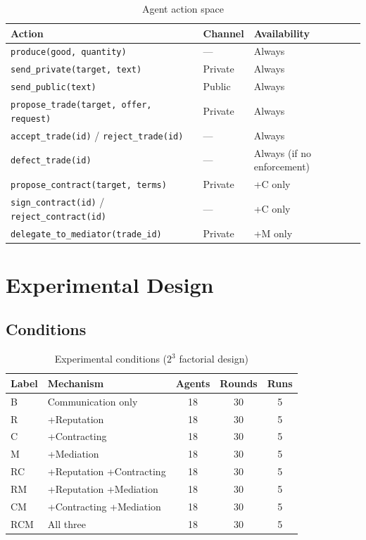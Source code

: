 \documentclass[12pt, a4paper]{article}
\begin{document}
\begin{table}[H]
\centering
\caption{Agent action space}
\label{tab:actions}
\begin{tabular}{@{}lll@{}}
\toprule
Action & Channel & Availability \\
\midrule
\texttt{produce(good, quantity)} & — & Always \\
\texttt{send\_private(target, text)} & Private & Always \\
\texttt{send\_public(text)} & Public & Always \\
\texttt{propose\_trade(target, offer, request)} & Private & Always \\
\texttt{accept\_trade(id)} / \texttt{reject\_trade(id)} & — & Always \\
\texttt{defect\_trade(id)} & — & Always (if no enforcement) \\
\texttt{propose\_contract(target, terms)} & Private & +C only \\
\texttt{sign\_contract(id)} / \texttt{reject\_contract(id)} & — & +C only \\
\texttt{delegate\_to\_mediator(trade\_id)} & Private & +M only \\
\bottomrule
\end{tabular}
\end{table}

\section{Experimental Design}
\label{sec:experiments}

\subsection{Conditions}

\begin{table}[H]
\centering
\caption{Experimental conditions ($2^3$ factorial design)}
\label{tab:conditions}
\begin{tabular}{@{}llccc@{}}
\toprule
Label & Mechanism & Agents & Rounds & Runs \\
\midrule
B   & Communication only        & 18 & 30 & 5 \\
R   & +Reputation               & 18 & 30 & 5 \\
C   & +Contracting              & 18 & 30 & 5 \\
M   & +Mediation                & 18 & 30 & 5 \\
RC  & +Reputation +Contracting  & 18 & 30 & 5 \\
RM  & +Reputation +Mediation    & 18 & 30 & 5 \\
CM  & +Contracting +Mediation   & 18 & 30 & 5 \\
RCM & All three                 & 18 & 30 & 5 \\
\bottomrule
\end{tabular}
\end{table}
\end{document}
